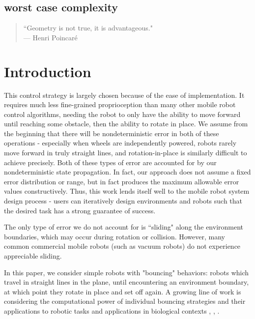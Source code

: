 \documentclass[]{styles/svproc}  %
\begin{document}
\subsection{worst case complexity}

\iffalse

{\small
\begin{center}
\begin{quotation}
``Geometry is not true, it is advantageous." \\
\hfill    --- Henri Poincar\'e
\end{quotation}
\end{center}
}


\section{Introduction} 

This control strategy is largely chosen because of the ease of implementation.
It requires much less fine-grained proprioception than many other mobile robot
control algorithms, needing the robot to only have the ability to move forward
until reaching some obstacle, then the ability to rotate in place. We assume
from the beginning that there will be nondeterministic error in both of these
operations - especially when wheels are independently powered, robots rarely
move forward in truly straight lines, and rotation-in-place is similarly
difficult to achieve precisely. Both of these types of error are accounted for
by our nondeterministic state propagation. In fact, our approach does not assume
a fixed error distribution or range, but in fact produces the maximum allowable
error values constructively. Thus, this work lends itself well to the mobile
robot system design process - users can iteratively design environments and
robots such that the desired task has a strong guarantee of success.

The only type of error we do not
account for is ``sliding" along the environment boundaries, which may occur
during rotation or collision. However, many common commercial mobile robots
(such as vacuum robots) do not experience appreciable sliding.

In this paper, we consider simple robots with "bouncing" behaviors: robots which
travel in straight lines in the plane, until encountering an environment
boundary, at which point they rotate in place and set off again. A growing line
of work is considering the computational power of individual bouncing strategies
and their applications to robotic tasks and applications in biological contexts
\cite{ErLav13}, \cite{microorganism2017}, \cite{alam2017minimalist}.
\end{document}
